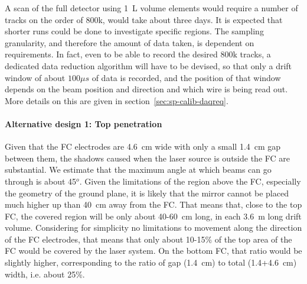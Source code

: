 
A scan of the full detector using \SI{1}{L} volume elements would require a number of tracks on the order of 800k, would take about three days. It is expected that shorter runs could be done to investigate specific regions. The sampling granularity, and therefore the amount of data taken, is dependent on  requirements. In fact, even to be able to record the desired 800k tracks, a dedicated data reduction algorithm will have to be devised, so that only a drift window of about $100 \mu s$ of data is recorded, and the position of that window depends on the beam position and direction and which wire is being read out. More details on this are given in section~\ref{sec:sp-calib-daqreq}.



\paragraph{Alternative design 1: Top  penetration}

Given that the FC electrodes are 4.6~cm wide with only a small 1.4~cm gap between them, the shadows caused when the laser source is outside the FC are substantial. We estimate that the maximum angle at which beams can go through is about 45$^{o}$. Given the limitations of the region above the FC, especially the geometry of the ground plane, it is likely that the mirror cannot be placed much higher up than 40~cm away from the FC. That means that, close to the top FC, the covered region will be only about 40-60~cm long, in each 3.6~m long drift volume. Considering for simplicity no limitations to movement along the direction of the FC electrodes, that means that only about 10-15\% of the top area of the FC would be covered by the laser system. On the bottom FC, that ratio would be slightly higher, corresponding to the ratio of gap (1.4~cm) to total (1.4+4.6~cm) width, i.e. about 25\%.

